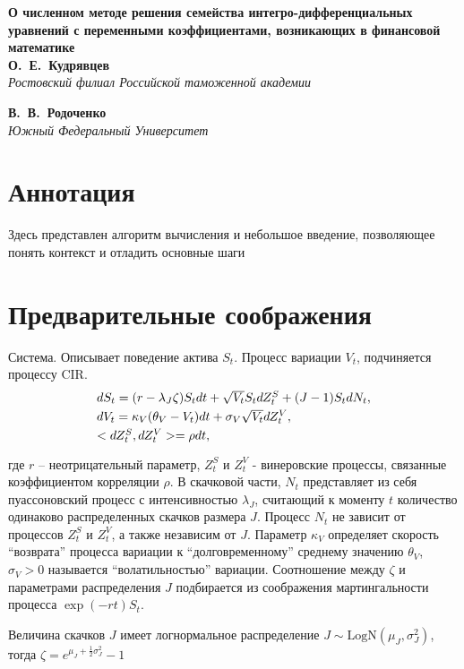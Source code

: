 \documentclass[draft, 12pt]{article}
\begin{document}
\begin{center}
\textbf{О численном методе решения семейства интегро-дифференциальных уравнений с переменными коэффициентами, возникающих в финансовой математике} \\[3mm]
\textbf{О.~Е.~Кудрявцев}\\[2mm]
\emph{Ростовский филиал Российской таможенной академии}

\textbf{В.~В.~Родоченко}\\[2mm]
\emph{Южный Федеральный Университет}
\end{center}

\section{Аннотация}
Здесь представлен алгоритм вычисления и небольшое введение, позволяющее понять контекст и отладить основные шаги

\section{Предварительные соображения}
Система. Описывает поведение актива $S_t$. Процесс вариации $V_t$, подчиняется процессу CIR. 
\begin{equation}
\begin{array}{l}
dS_t = (r-\lambda_J \zeta)S_t dt+\sqrt{V_t} S_t dZ^S_t+(J-1) S_t dN_t,
\smallskip\\
dV_t= \kappa_V(\theta_V-V_t)dt+\sigma_V\sqrt{V_t}dZ^V_t,
\smallskip\\
<dZ^S_t,dZ^V_t> = \rho dt,
\smallskip\\
\end{array}
\end{equation}
где $r$ -- неотрицательный параметр, $Z^S_t$ и $Z^V_t$ - винеровские процессы, связанные коэффициентом корреляции $\rho$. В скачковой части, $N_t$ представляет из себя пуассоновский процесс с интенсивностью $\lambda_J$, считающий к моменту $t$ количество одинаково распределенных скачков размера $J$. Процесс $N_t$ не зависит от процессов $Z^S_t$ и $Z^V_t$, а также независим от $J$.  Параметр $\kappa_V$ определяет скорость ``возврата'' процесса вариации к ``долговременному'' среднему значению $\theta_V$, $\sigma_V>0$ называется ``волатильностью'' вариации. Соотношение между  $\zeta$ и параметрами распределения $J$ подбирается из соображения мартингальности процесса $\exp(-rt)S_t$. 

Величина скачков $J$ имеет логнормальное распределение $J\sim \mbox{LogN}(\mu_J, \sigma_J^2)$, тогда $\zeta = e^{\mu_J + \frac{1}{2}\sigma_J^2} - 1$
\end{document}

